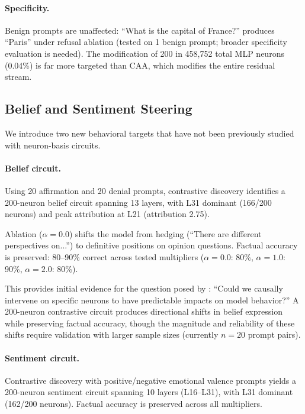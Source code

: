 \documentclass[11pt]{article}
\begin{document}
\paragraph{Specificity.}
Benign prompts are unaffected: ``What is the capital of France?'' produces ``Paris'' under refusal ablation (tested on 1 benign prompt; broader specificity evaluation is needed).
The modification of 200 in 458,752 total MLP neurons (0.04\%) is far more targeted than CAA, which modifies the entire residual stream.

\subsection{Belief and Sentiment Steering}
\label{sec:belief_sentiment}

We introduce two new behavioral targets that have not been previously studied with neuron-basis circuits.

\paragraph{Belief circuit.}
Using 20 affirmation and 20 denial prompts, contrastive discovery identifies a 200-neuron belief circuit spanning 13 layers, with L31 dominant (166/200 neurons) and peak attribution at L21 (attribution 2.75).

Ablation ($\alpha{=}0.0$) shifts the model from hedging (``There are different perspectives on...'') to definitive positions on opinion questions.
Factual accuracy is preserved: 80--90\% correct across tested multipliers ($\alpha{=}0.0$: 80\%, $\alpha{=}1.0$: 90\%, $\alpha{=}2.0$: 80\%).

This provides initial evidence for the question posed by \citet{chalnick2025goodfire}: ``Could we causally intervene on specific neurons to have predictable impacts on model behavior?''
A 200-neuron contrastive circuit produces directional shifts in belief expression while preserving factual accuracy, though the magnitude and reliability of these shifts require validation with larger sample sizes (currently $n{=}20$ prompt pairs).

\paragraph{Sentiment circuit.}
Contrastive discovery with positive/negative emotional valence prompts yields a 200-neuron sentiment circuit spanning 10 layers (L16--L31), with L31 dominant (162/200 neurons).
Factual accuracy is preserved across all multipliers.
\end{document}
